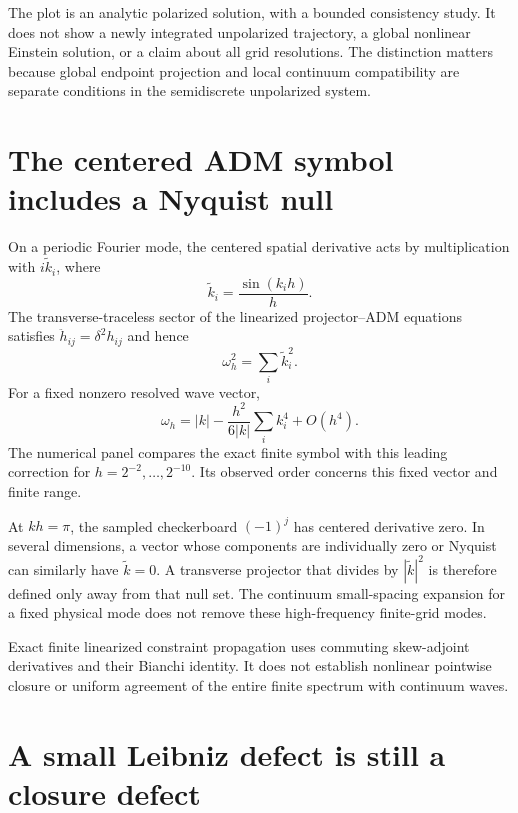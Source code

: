 The plot is an analytic polarized solution, with a bounded consistency study. It does not show a newly integrated unpolarized trajectory, a global nonlinear Einstein solution, or a claim about all grid resolutions. The distinction matters because global endpoint projection and local continuum compatibility are separate conditions in the semidiscrete unpolarized system.



\clearpage
\section{The centered ADM symbol includes a Nyquist null}

On a periodic Fourier mode, the centered spatial derivative acts by multiplication with $i\widetilde k_i$, where
\[
\widetilde k_i=\frac{\sin(k_i h)}h.
\]
The transverse-traceless sector of the linearized projector--ADM equations satisfies $\ddot h_{ij}=\delta^2 h_{ij}$ and hence
\[
\omega_h^2=\sum_i\widetilde k_i^2.
\]
For a fixed nonzero resolved wave vector,
\[
\omega_h=|k|-\frac{h^2}{6|k|}\sum_i k_i^4+O(h^4).
\]
The numerical panel compares the exact finite symbol with this leading correction for $h=2^{-2},\ldots,2^{-10}$. Its observed order concerns this fixed vector and finite range.

At $kh=\pi$, the sampled checkerboard $(-1)^j$ has centered derivative zero. In several dimensions, a vector whose components are individually zero or Nyquist can similarly have $\widetilde k=0$. A transverse projector that divides by $|\widetilde k|^2$ is therefore defined only away from that null set. The continuum small-spacing expansion for a fixed physical mode does not remove these high-frequency finite-grid modes.

Exact finite linearized constraint propagation uses commuting skew-adjoint derivatives and their Bianchi identity. It does not establish nonlinear pointwise closure or uniform agreement of the entire finite spectrum with continuum waves.



\clearpage
\section{A small Leibniz defect is still a closure defect}

